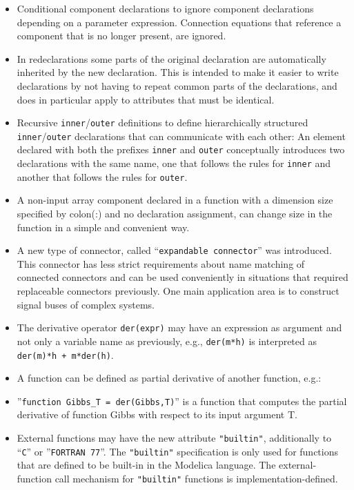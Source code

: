 \begin{itemize}
\item
  Conditional component declarations to ignore component declarations
  depending on a parameter expression. Connection equations that
  reference a component that is no longer present, are ignored.
\item
  In redeclarations some parts of the original declaration are
  automatically inherited by the new declaration. This is intended to
  make it easier to write declarations by not having to repeat common
  parts of the declarations, and does in particular apply to attributes
  that must be identical.
\item
  Recursive \lstinline!inner!/\lstinline!outer! definitions to define hierarchically structured
  \lstinline!inner!/\lstinline!outer! declarations that can communicate with each other: An
  element declared with both the prefixes \lstinline!inner! and \lstinline!outer! conceptually
  introduces two declarations with the same name, one that follows the
  rules for \lstinline!inner! and another that follows the rules for \lstinline!outer!.
\item
  A non-input array component declared in a function with a dimension
  size specified by colon(:) and no declaration assignment, can change
  size in the function in a simple and convenient way.
\item
  A new type of connector, called ``\lstinline!expandable connector!'' was
  introduced. This connector has less strict requirements about name
  matching of connected connectors and can be used conveniently in
  situations that required replaceable connectors previously. One main
  application area is to construct signal buses of complex systems.
\item
  The derivative operator \lstinline!der(expr)! may have an expression as argument
  and not only a variable name as previously, e.g., \lstinline!der(m*h)! is
  interpreted as \lstinline!der(m)*h + m*der(h)!.
\item
  A function can be defined as partial derivative of another function,
  e.g.:
\item
  ''\lstinline!function Gibbs_T = der(Gibbs,T)!'' is a function that computes the
  partial derivative of function Gibbs with respect to its input
  argument T.
\item
  External functions may have the new attribute \lstinline!"builtin"!, additionally
  to ``\lstinline!C!'' or ''\lstinline!FORTRAN 77!''. The \lstinline!"builtin"! specification is only used
  for functions that are defined to be built-in in the Modelica
  language. The external-function call mechanism for \lstinline!"builtin"! functions
  is implementation-defined.
\end{itemize}

